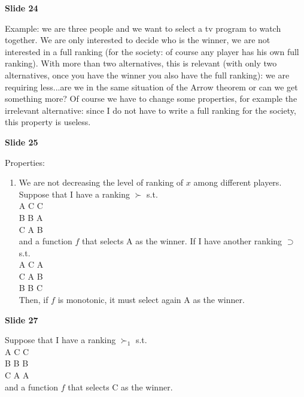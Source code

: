 \bigskip
\noindent \textbf{Slide 24}

\noindent Example: we are three people and we want to select a tv program to 
watch together. We are only interested to decide who is the winner, we are not 
interested in a full ranking (for the society: of course any player has his 
own full ranking). With more than two alternatives, this is relevant (with only 
two alternatives, once you have the winner you also have the full ranking): we 
are requiring less...are we in the same situation of the Arrow theorem or can 
we get something more? Of course we have to change some properties, for example 
the irrelevant alternative: since I do not have to write a full ranking for the 
society, this property is useless.

\bigskip
\noindent \textbf{Slide 25}

\noindent Properties:
\begin{enumerate}
	\item We are not decreasing the level of ranking of $x$ among different 
	players. Suppose that I have a ranking $\succ$ s.t.\\
	A \hspace{.6cm} C \hspace{.6cm} C\\
	B \hspace{.6cm} B \hspace{.6cm} A\\
	C \hspace{.6cm} A \hspace{.6cm} B\\
	and a function $f$ that selects A as the winner. If I have another ranking 
	$\supset$ s.t.\\
	A \hspace{.6cm} C \hspace{.6cm} A\\
	C \hspace{.6cm} A \hspace{.6cm} B\\
	B \hspace{.6cm} B \hspace{.6cm} C\\
	Then, if $f$ is monotonic, it must select again A as the winner.
\end{enumerate}

\bigskip
\noindent \textbf{Slide 27}

\noindent Suppose that I have a ranking $\succ_1$ s.t.\\
A \hspace{.6cm} C \hspace{.6cm} C\\
B \hspace{.6cm} B \hspace{.6cm} B\\
C \hspace{.6cm} A \hspace{.6cm} A\\
and a function $f$ that selects C as the winner.

